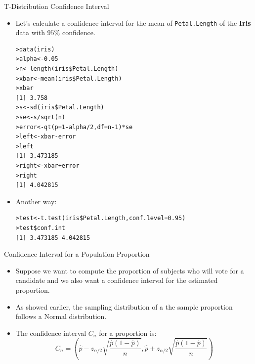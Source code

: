 \documentclass[handout]{beamer}
\begin{document}
\begin{frame}[fragile]{T-Distribution Confidence Interval}
\scriptsize{
\begin{itemize}
 \item Let's calculate a confidence interval for the mean of \verb+Petal.Length+ of the \textbf{Iris} data with $95\%$ confidence.
\begin{verbatim}
>data(iris)
>alpha<-0.05
>n<-length(iris$Petal.Length)
>xbar<-mean(iris$Petal.Length)
>xbar
[1] 3.758
>s<-sd(iris$Petal.Length)
>se<-s/sqrt(n)
>error<-qt(p=1-alpha/2,df=n-1)*se
>left<-xbar-error
>left
[1] 3.473185
>right<-xbar+error
>right
[1] 4.042815
\end{verbatim}
\item Another way:
\begin{verbatim}
>test<-t.test(iris$Petal.Length,conf.level=0.95)
>test$conf.int
[1] 3.473185 4.042815
\end{verbatim}


\end{itemize}


}
\end{frame}

\begin{frame}{Confidence Interval for a Population Proportion}
\scriptsize{
\begin{itemize}
 \item Suppose we want to compute the proportion of subjects who will vote for a candidate and we also want a confidence interval for the estimated proportion.
 
 \item As showed earlier, the sampling distribution of a the sample proportion follows a Normal distribution.

 \item The confidence interval $C_n$ for a proportion is:
\begin{displaymath}
 C_n = \left(\hat{p}-z_{\alpha/2}\sqrt{\frac{\hat{p}(1-\hat p)}{n}} , \hat{p} + z_{\alpha/2}\sqrt{\frac{\hat{p}(1-\hat p)}{n}}\right) 
 \end{displaymath} 



\end{itemize}

}

 
\end{frame}
\end{document}
